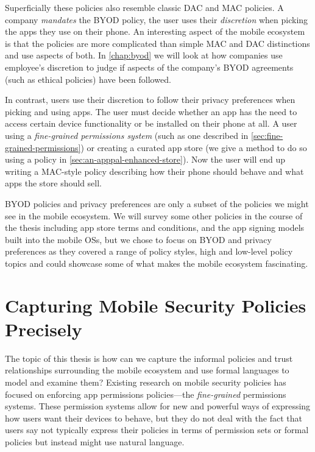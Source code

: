 \documentclass[thesis.tex]{subfiles}
\begin{document}
Superficially these policies also resemble classic \ac{DAC} and \ac{MAC}
policies. A company \emph{mandates} the \ac{BYOD} policy, the user uses
their \emph{discretion} when picking the apps they use on their phone.
An interesting aspect of the mobile ecosystem is that the policies are
more complicated than simple \ac{MAC} and \ac{DAC} distinctions and use aspects
of both.  In \autoref{chap:byod} we will look at how companies use
employee's discretion to judge if aspects of the company's \ac{BYOD}
agreements (such as ethical policies) have been followed.  

In contrast, users use their discretion to follow their privacy
preferences when picking and using apps.  The user must decide whether
an app has the need to access certain device functionality or be
installed on their phone at all.  A user using a \emph{fine-grained
permissions system} (such as one described in
\autoref{sec:fine-grained-permissions}) or creating a curated app
store (we give a method to do so using a policy in
\autoref{sec:an-apppal-enhanced-store}). Now the user will end up
writing a \ac{MAC}-style policy describing how their phone should
behave and what apps the store should sell.

\ac{BYOD} policies and privacy preferences are only a subset of the
policies we might see in the mobile ecosystem.  We will survey some
other policies in the course of the thesis including app store terms
and conditions, and the app signing models built into the mobile OSs,
but we chose to focus on \ac{BYOD} and privacy preferences as they covered
a range of policy styles, high and low-level policy topics and could
showcase some of what makes the mobile ecosystem fascinating.

\section{Capturing Mobile Security Policies Precisely}
\label{sec:methods}

The topic of this thesis is how can we capture the informal policies
and trust relationships surrounding the mobile ecosystem and use
formal languages to model and examine them?  Existing research on
mobile security policies has focused on enforcing app permissions
policies---the \emph{fine-grained} permissions systems.  These
permission systems allow for new and powerful ways of expressing how
users want their devices to behave, but they do not deal with the fact
that users say not typically express their policies in terms of
permission sets or formal policies but instead might use natural
language.
\end{document}

